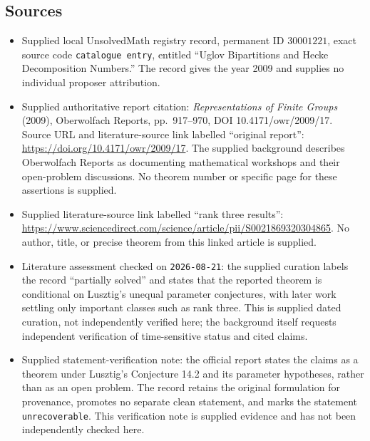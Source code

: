 \documentclass[11pt]{article}
\begin{document}
\subsection{Sources}
\begin{itemize}
\item Supplied local UnsolvedMath registry record, permanent ID \(30001221\), exact source code \texttt{catalogue entry}, entitled ``Uglov Bipartitions and Hecke Decomposition Numbers.'' The record gives the year 2009 and supplies no individual proposer attribution.
\item Supplied authoritative report citation: \emph{Representations of Finite Groups} (2009), Oberwolfach Reports, pp.\ 917--970, DOI 10.4171/owr/2009/17. Source URL and literature-source link labelled ``original report'': \url{https://doi.org/10.4171/owr/2009/17}. The supplied background describes Oberwolfach Reports as documenting mathematical workshops and their open-problem discussions. No theorem number or specific page for these assertions is supplied.
\item Supplied literature-source link labelled ``rank three results'': \url{https://www.sciencedirect.com/science/article/pii/S0021869320304865}. No author, title, or precise theorem from this linked article is supplied.
\item Literature assessment checked on \texttt{2026-08-21}: the supplied curation labels the record ``partially solved'' and states that the reported theorem is conditional on Lusztig's unequal parameter conjectures, with later work settling only important classes such as rank three. This is supplied dated curation, not independently verified here; the background itself requests independent verification of time-sensitive status and cited claims.
\item Supplied statement-verification note: the official report states the claims as a theorem under Lusztig's Conjecture 14.2 and its parameter hypotheses, rather than as an open problem. The record retains the original formulation for provenance, promotes no separate clean statement, and marks the statement \texttt{unrecoverable}. This verification note is supplied evidence and has not been independently checked here.
\end{itemize}
\end{document}
